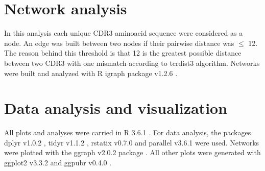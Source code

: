 \section*{Network analysis}

In this analysis each unique CDR3 aminoacid sequence were considered as a node. An edge was built between two nodes if their pairwise distance was $\leq$ 12. The reason behind this threshold is that 12 is the greatest possible distance between two CDR3 with one mismatch according to tcrdist3 algorithm. Networks were built and analyzed with R igraph package v1.2.6 \citep{igraph}.

\section*{Data analysis and visualization}

All plots and analyses were carried in R 3.6.1 \citep{r}. For data analysis, the packages dplyr v1.0.2 \citep{dplyr}, tidyr v1.1.2 \citep{tidyr}, rstatix v0.7.0 \citep{rstatix} and parallel v3.6.1 \citep{r} were used. Networks were plotted with the ggraph v2.0.2 package \citep{ggraph}. All other plots were generated with ggplot2 v3.3.2 \citep{ggplot2} and ggpubr v0.4.0 \citep{ggpubr}.
